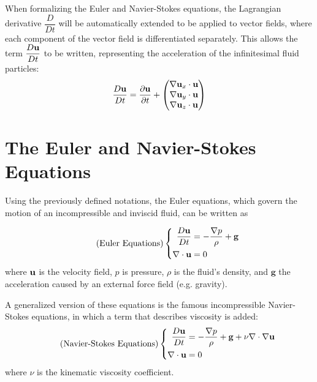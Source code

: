 When formalizing the Euler and Navier-Stokes equations, the Lagrangian derivative $\dfrac{D}{Dt}$ will be automatically extended to be applied to vector fields, where each component of the vector field is differentiated separately. This allows the term $\dfrac{D\textbf{u}}{Dt}$ to be written, representing the acceleration of the infinitesimal fluid particles:
\begin{equation}
    \label{Du/Dt}
    \frac{D\textbf{u}}{Dt} = \frac{\partial\textbf{u}}{\partial t}
    + \begin{pmatrix}
       \nabla \textbf{u}_x  \cdot \textbf{u}\\
        \nabla \textbf{u}_y \cdot \textbf{u}\\
        \nabla \textbf{u}_z \cdot \textbf{u}
     \end{pmatrix}
\end{equation}








\section{The Euler and Navier-Stokes Equations}
\label{Euler N-S Eqns}

Using the previously defined notations, the Euler equations, which govern the motion of an incompressible and inviscid fluid, can be written as


\begin{equation}
    \tag{Euler Equations}
    \left \{
    \begin{aligned}
         \frac{D\textbf{u}}{Dt}   &=   -\frac{\nabla p}{\rho} + \textbf{g} \\
         \nabla \cdot \textbf{u}   &=   0
    \end{aligned} \right.
    \label{eqn:Euler Equations}
\end{equation} 
where $\textbf{u}$ is the velocity field, $p$ is pressure, $\rho$ is the fluid's density, and $\textbf{g}$ the acceleration caused by an external force field (e.g. gravity).

A generalized version of these equations is the famous incompressible Navier-Stokes equations, in which a term that describes viscosity is added:
\begin{equation}
    \tag{Navier-Stokes Equations}
    \left \{
    \begin{aligned}
         \frac{D\textbf{u}}{Dt}   &=   -\frac{\nabla p}{\rho} + \textbf{g} + \nu \nabla \cdot \nabla \textbf{u} \\
         \nabla \cdot \textbf{u}  &=   0
    \end{aligned} \right.
    \label{eqn:Navier-Stokes Equations}
\end{equation} 
where $\nu$ is the kinematic viscosity coefficient.


